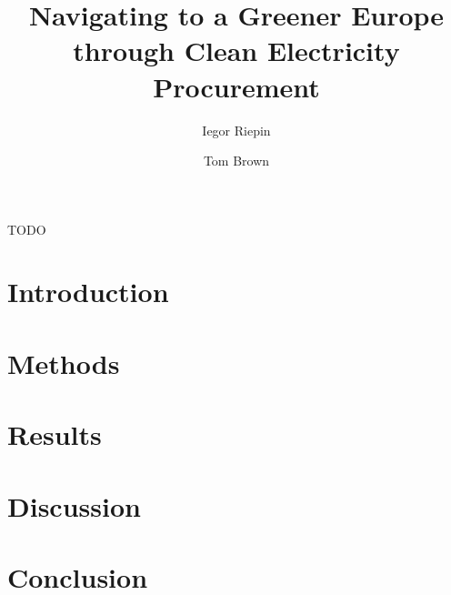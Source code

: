 \documentclass[11pt, 5p, nopreprintline]{elsarticle}
\begin{document}
\begin{frontmatter}

	\title{Navigating to a Greener Europe through Clean Electricity Procurement}
    
	\author[tubaddress]{Iegor Riepin}
	\author[tubaddress]{Tom Brown} 
	
	\address[tubaddress]{Department of Digital Transformation in Energy Systems, TU Berlin, Germany}

	\begin{abstract}
		
	\end{abstract}

	\begin{keyword}
		TODO
	\end{keyword}


\end{frontmatter}


\section{Introduction}
\label{sec:intro}


\section{Methods}
\label{sec:methods}


\section{Results}
\label{sec:results}


\section{Discussion}
\label{sec:discussion}


\section{Conclusion}
\label{sec:conclusion}

\end{document}
